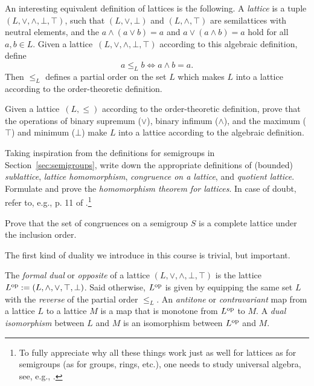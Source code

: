 An interesting equivalent definition of lattices is the following. A \emph{lattice} is a tuple $(L,\vee,\wedge,\bot,\top)$, such that $(L, \vee, \bot)$ and $(L,\wedge, \top)$ are semilattices with neutral elements, and the  $a \wedge (a \vee b) = a$ and $a \vee (a \wedge b) = a$ hold for all $a, b \in L$. 
% 
Given a lattice~$(L,\vee,\wedge,\bot,\top)$ according to this algebraic definition, define
\[ a \leq_L b \iff a \wedge b = a.\]
Then $\leq_L$ defines a partial order on the set $L$ which makes $L$ into a lattice according to the order-theoretic definition.

\begin{exercise}\easy
Given a lattice~${(L,\leq)}$ according to the order-theoretic definition, prove that the operations of binary supremum ($\vee$), binary infimum ($\wedge$), and the maximum ($\top$) and minimum ($\bot$) make $L$ into a lattice according to the algebraic definition.
\end{exercise}

\begin{exercise}\medium
Taking inspiration from the definitions for semigroups in Section~\ref{sec:semigroups}, write down the appropriate definitions of (bounded) \emph{sublattice}, \emph{lattice homomorphism}, \emph{congruence on a lattice}, and \emph{quotient lattice}. Formulate and prove the \emph{homomorphism theorem for lattices}. In case of doubt, refer to, e.g., p. 11 of \cite{thebook}.\footnote{To fully appreciate why all these things work just as well for lattices as for semigroups (as for groups, rings, etc.), one needs to study universal algebra, see, e.g., \cite{BurSan2000}.}
\end{exercise}

\begin{exercise}\medium\label{exe:conlattice}
Prove that the set of congruences on a semigroup $S$ is a complete lattice under the inclusion order.
\end{exercise}
The first kind of duality we introduce in this course is trivial, but important. 
\begin{definition}
  The \emph{formal dual} or \emph{opposite} of a lattice $(L, \vee, \wedge, \bot, \top)$ is the lattice $L^{\mathrm{op}} := (L, \wedge, \vee, \top, \bot)$. Said otherwise, $L^{\mathrm{op}}$ is given by equipping the same set $L$ with the \emph{reverse} of the partial order $\leq_L$. An \emph{antitone} or \emph{contravariant} map from a lattice $L$ to a lattice $M$ is a map that is monotone from $L^{\mathrm{op}}$ to $M$. A \emph{dual isomorphism} between $L$ and $M$ is an isomorphism between $L^{\mathrm{op}}$ and $M$.
\end{definition}

